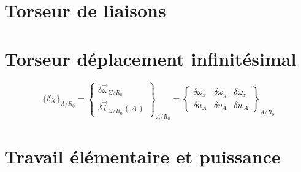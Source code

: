 \section{Torseur de liaisons}
\section{Torseur déplacement infinitésimal}
\begin{defi}

$${\lbrace\delta\chi\rbrace}_{A/R_0}=\begin{Bmatrix}\delta\overrightarrow{\omega}_{\Sigma/R_0}\\\delta\overrightarrow{l}_{\Sigma/R_0}(A)\end{Bmatrix}_{A/R_0}=\begin{Bmatrix} \delta\omega_x & \delta\omega_y  & \delta\omega_z\\ \delta u_A & \delta v_A & \delta w_A\end{Bmatrix}_{A/R_0}$$
\end{defi}
\section{Travail élémentaire et puissance}